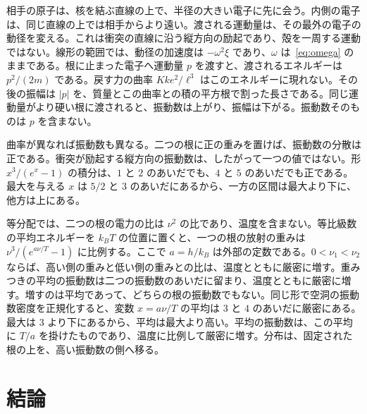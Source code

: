 \documentclass[a4paper]{article}
\begin{document}
相手の原子は、核を結ぶ直線の上で、半径の大きい電子に先に会う。内側の電子は、同じ直線の上では相手からより遠い。渡される運動量は、その最外の電子の動径を変える。これは衝突の直線に沿う縦方向の励起であり、殻を一周する運動ではない。線形の範囲では、動径の加速度は \(-\omega^{2}\xi\) であり、\(\omega\) は~\eqref{eq:omega} のままである。根に止まった電子へ運動量 \(p\) を渡すと、渡されるエネルギーは \(p^{2}/(2m)\) である。戻す力の曲率 \(K k e^{2}/\ell^{3}\) はこのエネルギーに現れない。その後の振幅は \(|p|\) を、質量とこの曲率との積の平方根で割った長さである。同じ運動量がより硬い根に渡されると、振動数は上がり、振幅は下がる。振動数そのものは \(p\) を含まない。

曲率が異なれば振動数も異なる。二つの根に正の重みを置けば、振動数の分散は正である。衝突が励起する縦方向の振動数は、したがって一つの値ではない。形 \(x^{3}/(e^{x}-1)\) の積分は、\(1\) と \(2\) のあいだでも、\(4\) と \(5\) のあいだでも正である。最大を与える \(x\) は \(5/2\) と \(3\) のあいだにあるから、一方の区間は最大より下に、他方は上にある。

等分配では、二つの根の電力の比は \(\nu^{2}\) の比であり、温度を含まない。等比級数の平均エネルギーを \(k_B T\) の位置に置くと、一つの根の放射の重みは \(\nu^{3}/(e^{a\nu/T}-1)\) に比例する。ここで \(a=h/k_B\) は外部の定数である。\(0<\nu_1<\nu_2\) ならば、高い側の重みと低い側の重みとの比は、温度とともに厳密に増す。重みつきの平均の振動数は二つの振動数のあいだに留まり、温度とともに厳密に増す。増すのは平均であって、どちらの根の振動数でもない。同じ形で空洞の振動数密度を正規化すると、変数 \(x=a\nu/T\) の平均は \(3\) と \(4\) のあいだに厳密にある。最大は \(3\) より下にあるから、平均は最大より高い。平均の振動数は、この平均に \(T/a\) を掛けたものであり、温度に比例して厳密に増す。分布は、固定された根の上を、高い振動数の側へ移る。

\section{結論}
\end{document}
